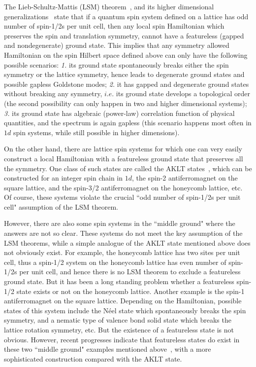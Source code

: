 \documentclass[aps,prb,twocolumn,superscriptaddress,showpacs]{revtex4}
\begin{document}
The Lieb-Schultz-Mattis (LSM) theorem~\cite{LSM}, and its higher
dimensional generalizations~\cite{oshikawa,hastings} state that if
a quantum spin system defined on a lattice has odd number of
spin-1/2s per unit cell, then any local spin Hamiltonian which
preserves the spin and translation symmetry, cannot have a
featureless (gapped and nondegenerate) ground state. This implies
that any symmetry allowed Hamiltonian on the spin Hilbert space
defined above can only have the following possible scenarios: {\it
1.} its ground state spontaneously breaks either the spin symmetry
or the lattice symmetry, hence leads to degenerate ground states
and possible gapless Goldstone modes; {\it 2.} it has gapped and
degenerate ground states without breaking any symmetry, $i.e.$ its
ground state develops a topological order (the second possibility
can only happen in two and higher dimensional systems); {\it 3.}
its ground state has algebraic (power-law) correlation function of
physical quantities, and the spectrum is again gapless (this
scenario happens most often in $1d$ spin systems, while still
possible in higher dimensions).

On the other hand, there are lattice spin systems for which one
can very easily construct a local Hamiltonian with a featureless
ground state that preserves all the symmetry. One class of such
states are called the AKLT states~\cite{AKLT}, which can be
constructed for an integer spin chain in $1d$, the spin-2
antiferromagnet on the square lattice, and the spin-3/2
antiferromagnet on the honeycomb lattice, etc. Of course, these
systems violate the crucial ``odd number of spin-1/2s per unit
cell" assumption of the LSM theorem.

However, there are also some spin systems in the ``middle ground"
where the answers are not so clear. These systems do not meet the
key assumption of the LSM theorems, while a simple analogue of the
AKLT state mentioned above does not obviously exist. For example,
the honeycomb lattice has two sites per unit cell, thus a spin-1/2
system on the honeycomb lattice has even number of spin-1/2s per
unit cell, and hence there is no LSM theorem to exclude a
featureless ground state. But it has been a long standing problem
whether a featureless spin-1/2 state exists or not on the
honeycomb lattice. Another example is the spin-1 antiferromagnet
on the square lattice. Depending on the Hamiltonian, possible
states of this system include the N\'{e}el state which
spontaneously breaks the spin symmetry, and a nematic type of
valence bond solid state which breaks the lattice rotation
symmetry, etc. But the existence of a featureless state is not
obvious. However, recent progresses indicate that featureless
states do exist in these two ``middle ground" examples mentioned
above~\cite{Kimchi,jian1,jian2}, with a more sophisticated
construction compared with the AKLT state.
\end{document}
